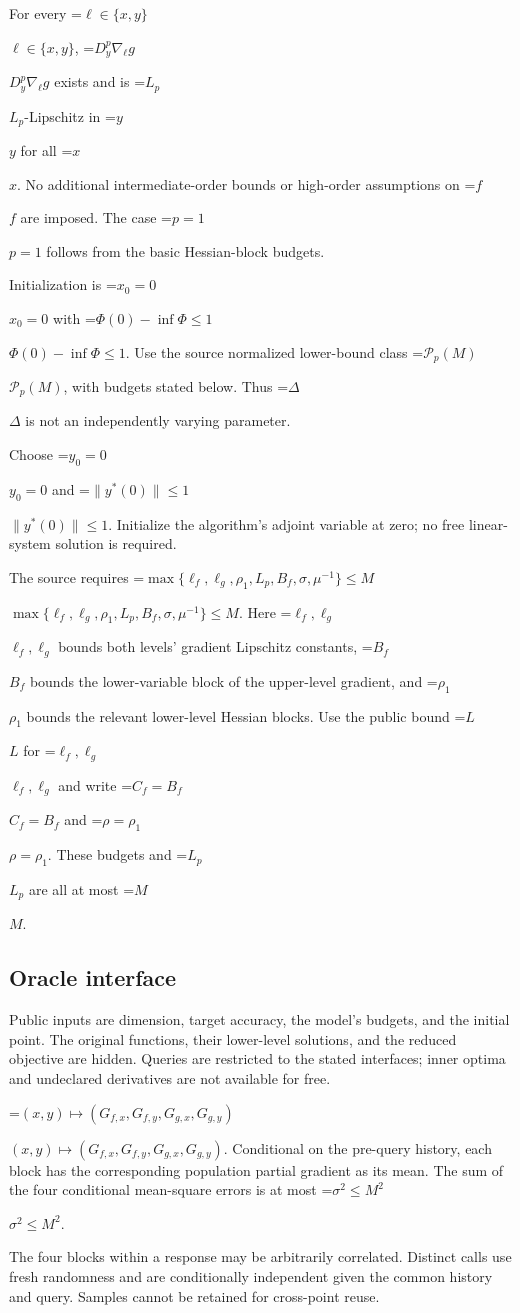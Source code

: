 \documentclass[10pt,a4paper]{article}
\newcommand{\AtlasMath}[1]{\par\begingroup\centering\setbox0=\hbox{$\displaystyle #1$}\ifdim\wd0>1.4\linewidth\typeout{ATLAS WIDE FORMULA: \the\wd0}\fi\ifdim\wd0>\linewidth\resizebox{\linewidth}{!}{\box0}\else\box0\fi\par\endgroup}
\newcommand{\AtlasInlineMath}[1]{\begingroup\setbox0=\hbox{$#1$}\ifdim\wd0>.4\linewidth\endgroup\AtlasMath{#1}\else\endgroup$#1$\fi}
\begin{document}
For every \AtlasInlineMath{\ell\in\{x,y\}}, \AtlasInlineMath{D_y^p\nabla_\ell g} exists and is \AtlasInlineMath{L_p}-Lipschitz in \AtlasInlineMath{y} for all \AtlasInlineMath{x}. No additional intermediate-order bounds or high-order assumptions on \AtlasInlineMath{f} are imposed. The case \AtlasInlineMath{p=1} follows from the basic Hessian-block budgets.

Initialization is \AtlasInlineMath{x_0=0} with \AtlasInlineMath{\Phi(0)-\inf\Phi\le1}. Use the source normalized lower-bound class \AtlasInlineMath{\mathcal{P}_p(M)}, with budgets stated below. Thus \AtlasInlineMath{\Delta} is not an independently varying parameter.

Choose \AtlasInlineMath{y_0=0} and \AtlasInlineMath{\|y^*(0)\|\le1}. Initialize the algorithm's adjoint variable at zero; no free linear-system solution is required.

The source requires \AtlasInlineMath{\max\{\ell_f,\ell_g,\rho_1,L_p,B_f,\sigma,\mu^{-1}\}\le M}. Here \AtlasInlineMath{\ell_f,\ell_g} bounds both levels' gradient Lipschitz constants, \AtlasInlineMath{B_f} bounds the lower-variable block of the upper-level gradient, and \AtlasInlineMath{\rho_1} bounds the relevant lower-level Hessian blocks. Use the public bound \AtlasInlineMath{L} for \AtlasInlineMath{\ell_f,\ell_g} and write \AtlasInlineMath{C_f=B_f} and \AtlasInlineMath{\rho=\rho_1}. These budgets and \AtlasInlineMath{L_p} are all at most \AtlasInlineMath{M}.

\subsection{Oracle interface}
Public inputs are dimension, target accuracy, the model's budgets, and the initial point. The original functions, their lower-level solutions, and the reduced objective are hidden. Queries are restricted to the stated interfaces; inner optima and undeclared derivatives are not available for free.

\AtlasInlineMath{(x,y)\longmapsto (G_{f,x},G_{f,y},G_{g,x},G_{g,y})}. Conditional on the pre-query history, each block has the corresponding population partial gradient as its mean. The sum of the four conditional mean-square errors is at most \AtlasInlineMath{\sigma^2\le M^2}.

The four blocks within a response may be arbitrarily correlated. Distinct calls use fresh randomness and are conditionally independent given the common history and query. Samples cannot be retained for cross-point reuse.
\end{document}
